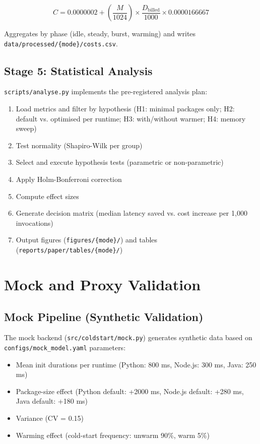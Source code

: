 \begin{equation}
C = 0.0000002 + \left(\frac{M}{1024}\right) \times \frac{D_{\text{billed}}}{1000} \times 0.0000166667
\end{equation}

Aggregates by phase (idle, steady, burst, warming) and writes \texttt{data/processed/\{mode\}/costs.csv}.

\subsection{Stage 5: Statistical Analysis}

\texttt{scripts/analyse.py} implements the pre-registered analysis plan:

\begin{enumerate}
    \item Load metrics and filter by hypothesis (H1: minimal packages only; H2: default vs. optimised per runtime; H3: with/without warmer; H4: memory sweep)
    \item Test normality (Shapiro-Wilk per group)
    \item Select and execute hypothesis tests (parametric or non-parametric)
    \item Apply Holm-Bonferroni correction
    \item Compute effect sizes
    \item Generate decision matrix (median latency saved vs. cost increase per 1,000 invocations)
    \item Output figures (\texttt{figures/\{mode\}/}) and tables (\texttt{reports/paper/tables/\{mode\}/})
\end{enumerate}

\section{Mock and Proxy Validation}

\subsection{Mock Pipeline (Synthetic Validation)}

The mock backend (\texttt{src/coldstart/mock.py}) generates synthetic data based on \texttt{configs/mock\_model.yaml} parameters:

\begin{itemize}
    \item Mean init durations per runtime (Python: 800 ms, Node.js: 300 ms, Java: 250 ms)
    \item Package-size effect (Python default: +2000 ms, Node.js default: +280 ms, Java default: +180 ms)
    \item Variance (CV = 0.15)
    \item Warming effect (cold-start frequency: unwarm 90\%, warm 5\%)
\end{itemize}

